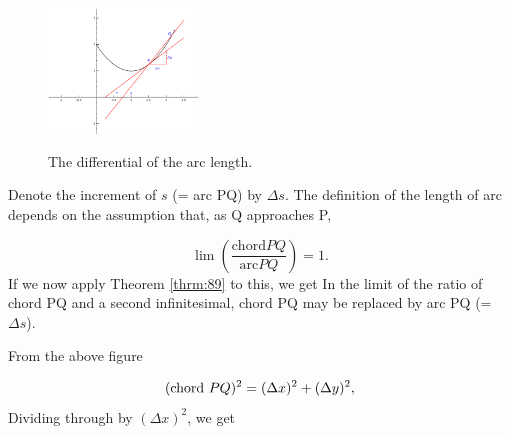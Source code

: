 \begin{figure}[h!]
\begin{minipage}{\textwidth}
\begin{center}
\includegraphics[height=4cm,width=4cm]{parabola-tangent4.eps}
\end{center}
\end{minipage}
\caption{The differential of the arc length.}
\label{fig:derivative-arc}
\end{figure}


Denote the increment of $s$ (= arc PQ) by $\Delta s$. 
The definition of the length of arc depends on the 
assumption that, as Q approaches P,

\[
    \lim \left ( \frac{\mbox{chord} PQ}{\mbox{arc} PQ} \right ) = 1.
\]
If we now apply Theorem \ref{thrm:89} %
to this, we get
In the limit of the ratio of chord PQ and a second infinitesimal, 
chord PQ may be replaced by arc PQ (= $\Delta s$).

From the above figure

\begin{equation}
({\rm chord}\ PQ)^2 = (\Delta x)^2 + (\Delta y)^2,
\label{eqn:H-90}
\end{equation}
Dividing through by $(\Delta x)^2$, we get

